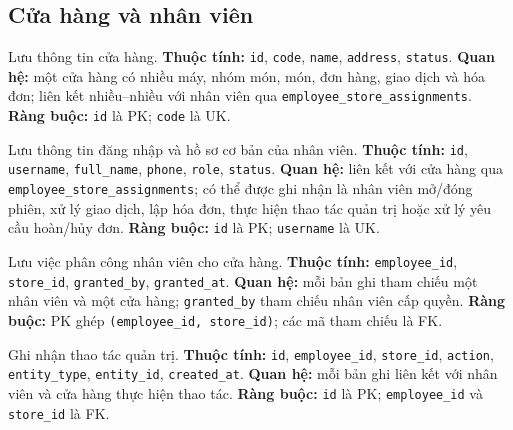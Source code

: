 \subsection{Cửa hàng và nhân viên}
\begin{description}[leftmargin=3.7cm,labelwidth=3.5cm,style=nextline]
  \item[\texttt{stores}] Lưu thông tin cửa hàng. \textbf{Thuộc tính:} \texttt{id}, \texttt{code}, \texttt{name}, \texttt{address}, \texttt{status}. \textbf{Quan hệ:} một cửa hàng có nhiều máy, nhóm món, món, đơn hàng, giao dịch và hóa đơn; liên kết nhiều--nhiều với nhân viên qua \texttt{employee\_store\_assignments}. \textbf{Ràng buộc:} \texttt{id} là PK; \texttt{code} là UK.
  \item[\texttt{employees}] Lưu thông tin đăng nhập và hồ sơ cơ bản của nhân viên. \textbf{Thuộc tính:} \texttt{id}, \texttt{username}, \texttt{full\_name}, \texttt{phone}, \texttt{role}, \texttt{status}. \textbf{Quan hệ:} liên kết với cửa hàng qua \texttt{employee\_store\_assignments}; có thể được ghi nhận là nhân viên mở/đóng phiên, xử lý giao dịch, lập hóa đơn, thực hiện thao tác quản trị hoặc xử lý yêu cầu hoàn/hủy đơn. \textbf{Ràng buộc:} \texttt{id} là PK; \texttt{username} là UK.
  \item[\texttt{employee\_store\_assignments}] Lưu việc phân công nhân viên cho cửa hàng. \textbf{Thuộc tính:} \texttt{employee\_id}, \texttt{store\_id}, \texttt{granted\_by}, \texttt{granted\_at}. \textbf{Quan hệ:} mỗi bản ghi tham chiếu một nhân viên và một cửa hàng; \texttt{granted\_by} tham chiếu nhân viên cấp quyền. \textbf{Ràng buộc:} PK ghép \texttt{(employee\_id, store\_id)}; các mã tham chiếu là FK.
  \item[\texttt{management\_audit}] Ghi nhận thao tác quản trị. \textbf{Thuộc tính:} \texttt{id}, \texttt{employee\_id}, \texttt{store\_id}, \texttt{action}, \texttt{entity\_type}, \texttt{entity\_id}, \texttt{created\_at}. \textbf{Quan hệ:} mỗi bản ghi liên kết với nhân viên và cửa hàng thực hiện thao tác. \textbf{Ràng buộc:} \texttt{id} là PK; \texttt{employee\_id} và \texttt{store\_id} là FK.
\end{description}

